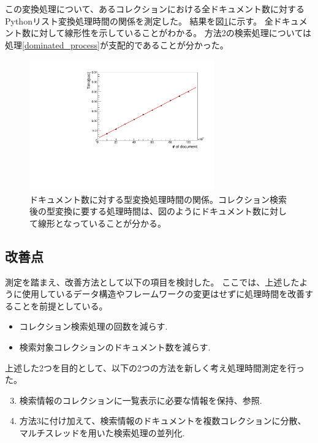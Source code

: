 この変換処理について、あるコレクションにおける全ドキュメント数に対するPythonリスト変換処理時間の関係を測定した。
結果を図\ref{dominated_process_relation}に示す。
全ドキュメント数に対して線形性を示していることがわかる。
方法2の検索処理については処理\ref{dominated_process}が支配的であることが分かった。
\begin{figure}[bpt]
  \begin{center}
    \includegraphics[width=8cm,angle=270]{dominated_process_relation.pdf}
  \caption[ドキュメント数に対する型変換処理時間の関係]{ドキュメント数に対する型変換処理時間の関係。コレクション検索後の型変換に要する処理時間は、図のようにドキュメント数に対して線形となっていることが分かる。}
  \label{dominated_process_relation}
  \end{center}
\end{figure}

\subsection{改善点}

測定を踏まえ、改善方法として以下の項目を検討した。
ここでは、上述したように使用しているデータ構造やフレームワークの変更はせずに処理時間を改善することを前提としている。
\begin{itemize}
  \item コレクション検索処理の回数を減らす.
  \item 検索対象コレクションのドキュメント数を減らす.
\end{itemize}

上述した2つを目的として、以下の2つの方法を新しく考え処理時間測定を行った。

\begin{enumerate}
  \setcounter{enumi}{2}
  \item 検索情報のコレクションに一覧表示に必要な情報を保持、参照.
  \item 方法3に付け加えて、検索情報のドキュメントを複数コレクションに分散、マルチスレッドを用いた検索処理の並列化.
\end{enumerate}

